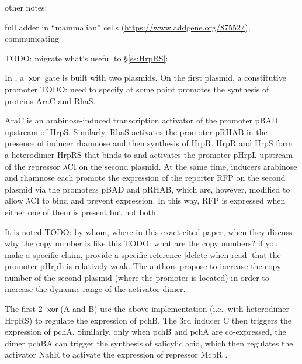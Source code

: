 \documentclass[12pt,notitlepage]{article}
\newcommand{\TODO}[1]{\textrm{\color{red}TODO: #1}}
\newcommand{\XOR}{\ensuremath{\mathop{\mathsf{xor}}}\xspace}
\newcommand{\hh}[1]{{\color{Purple}#1}}
\newcommand{\ra}[1]{{\color{Blue}#1}}
\begin{document}
	

\ra{other notes:}

\ra{full adder in ``mammalian'' cells \cite{WeinbergETAL2017} (\url{https://www.addgene.org/87552/}),
communicating \cite{AuslaenderETAL2017}}



%


\TODO{migrate what's useful to \S\ref{ss:HrpRS}:}

In \cite[\href{https://bmcbiol.biomedcentral.com/articles/10.1186/s12915-015-0146-0/figures/5}{Fig.~5}]{Wong2015}, 
a \XOR gate is built with two plasmids. 
%
On the first plasmid, 
a constitutive promoter \TODO{need to specify at some point}
promotes the synthesis of proteins AraC and RhaS.
%
\ra{
AraC is an arabinose-induced transcription activator
of the promoter pBAD upstream of HrpS. 
%
Similarly, RhaS activates the promoter pRHAB in the presence of inducer rhamnose and then synthesis of HrpR.
%
HrpR and HrpS form a heterodimer HrpRS
that binds to and activates the promoter pHrpL 
upstream of the repressor $\lambda$CI 
on the second plasmid.
%
At the same time, inducers arabinose and rhamnose 
each promote the expression
of the reporter RFP on the second plasmid via
the promoters pBAD and pRHAB,
which are, however,
modified to allow $\lambda$CI to bind
and prevent expression.
%
In this way, 
RFP is expressed when either one of them is present but not both. 

It is noted \TODO{by whom, where \hh{in this exact cited paper, when they discuss why the copy number is like this} 
\TODO{what are the copy numbers?} 
\ra{if you make a specific claim, provide a specific reference [delete when read]}
}
that the promoter pHrpL is relatively weak.
%
The authors propose to 
increase the copy number of 
the second plasmid (where the promoter is located)
in order to
increase the dynamic range of the activator dimer.
}



\hh{
The first 2-\XOR (A and B) use the above implementation 
(i.e.~with heterodimer HrpRS) to regulate the expression of pchB. 
%
The 3rd inducer C then triggers the expression of pchA.
%
Similarly, only when pchB and pchA are co-expressed, the dimer pchBA can trigger the synthesis of salicylic acid, which then regulates the activator NahR to activate the expression of repressor McbR \cite{Rey2005}.

}
\end{document}
